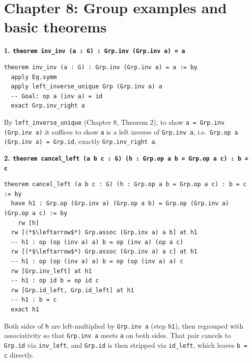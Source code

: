 \section{Chapter 8: Group examples and basic theorems}\label{sec:15-appendix-solutions:07-chapter-8:1}

\textbf{1. \texttt{theorem inv\_\allowbreak{}inv (a : G) : Grp.inv (Grp.inv a) = a}}

\begin{lstlisting}
theorem inv_inv (a : G) : Grp.inv (Grp.inv a) = a := by
  apply Eq.symm
  apply left_inverse_unique Grp (Grp.inv a) a
  -- Goal: op a (inv a) = id
  exact Grp.inv_right a
\end{lstlisting}

By \texttt{left\_\allowbreak{}inverse\_\allowbreak{}unique} (Chapter 8, Theorem 2), to show \texttt{a = Grp.inv (Grp.inv a)} it suffices to show \texttt{a} is a left inverse of \texttt{Grp.inv a}, i.e.~\texttt{Grp.op a (Grp.inv a) = Grp.id}, exactly \texttt{Grp.inv\_\allowbreak{}right a}.

\textbf{2. \texttt{theorem cancel\_\allowbreak{}left (a b c : G) (h : Grp.op a b = Grp.op a c) : b = c}}

\begin{lstlisting}
theorem cancel_left (a b c : G) (h : Grp.op a b = Grp.op a c) : b = c := by
  have h1 : Grp.op (Grp.inv a) (Grp.op a b) = Grp.op (Grp.inv a) (Grp.op a c) := by
    rw [h]
  rw [(*$\leftarrow$*) Grp.assoc (Grp.inv a) a b] at h1
  -- h1 : op (op (inv a) a) b = op (inv a) (op a c)
  rw [(*$\leftarrow$*) Grp.assoc (Grp.inv a) a c] at h1
  -- h1 : op (op (inv a) a) b = op (op (inv a) a) c
  rw [Grp.inv_left] at h1
  -- h1 : op id b = op id c
  rw [Grp.id_left, Grp.id_left] at h1
  -- h1 : b = c
  exact h1
\end{lstlisting}

Both sides of \texttt{h} are left-multiplied by \texttt{Grp.inv a} (step \texttt{h1}), then regrouped with associativity so that \texttt{Grp.inv a} meets \texttt{a} on both sides. That pair cancels to \texttt{Grp.id} via \texttt{inv\_\allowbreak{}left}, and \texttt{Grp.id} is then stripped via \texttt{id\_\allowbreak{}left}, which leaves \texttt{b = c} directly.
